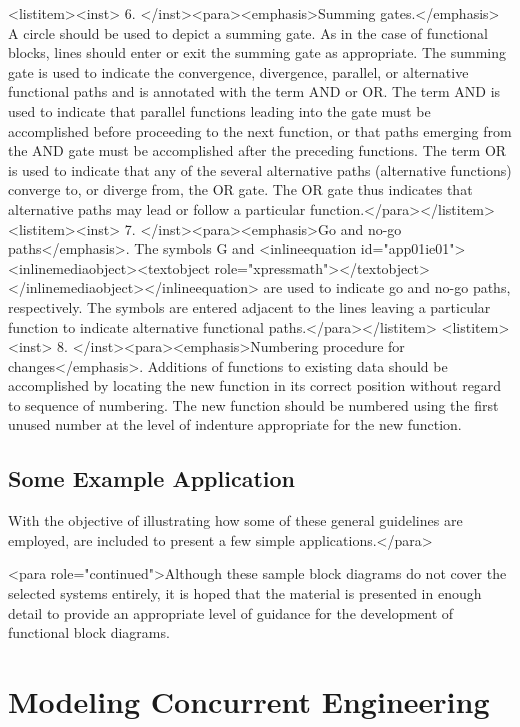 <listitem><inst>	6.	</inst><para><emphasis>Summing gates.</emphasis> A circle should be used to depict a summing gate. As in the case of functional blocks, lines should enter or exit the summing gate as appropriate. The summing gate is used to indicate the convergence, divergence, parallel, or alternative functional paths and is annotated with the term AND or OR. The term AND is used to indicate that parallel functions leading into the gate must be accomplished before proceeding to the next function, or that paths emerging from the AND gate must be accomplished after the preceding functions. The term OR is used to indicate that any of the several alternative paths (alternative functions) converge to, or diverge from, the OR gate. The OR gate thus indicates that alternative paths may lead or follow a particular function.</para></listitem>
<listitem><inst>	7.	</inst><para><emphasis>Go and no-go paths</emphasis>. The symbols G and <inlineequation id="app01ie01"><inlinemediaobject><textobject role="xpressmath"></textobject></inlinemediaobject></inlineequation> are used to indicate go and no-go paths, respectively. The symbols are entered adjacent to the lines leaving a particular function to indicate alternative functional paths.</para></listitem>
<listitem><inst>	8.	</inst><para><emphasis>Numbering procedure for changes</emphasis>. Additions of functions to existing data should be accomplished by locating the new function in its correct position without regard to sequence of numbering. The new function should be numbered using the first unused number at the level of indenture appropriate for the new function.

\subsection{Some Example Application}

With the objective of illustrating how some of these general guidelines are employed, are included to present a few simple applications.</para>

<para role="continued">Although these sample block diagrams do not cover the selected systems entirely, it is hoped that the material is presented in enough detail to provide an appropriate level of guidance for the development of functional block diagrams.


\section{Modeling Concurrent Engineering}

